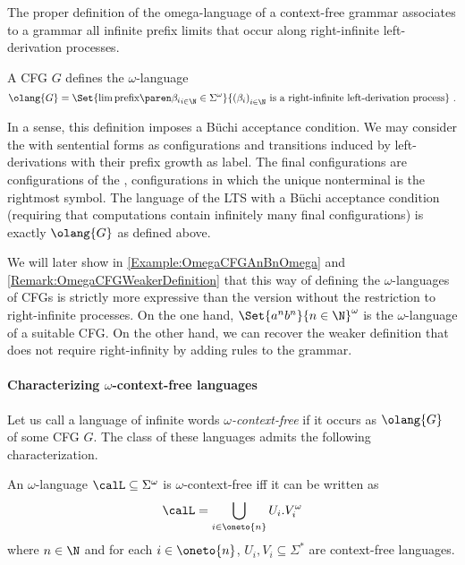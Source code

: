 \documentclass[../../diss.tex]{subfiles}
\begin{document}
The proper definition of the omega-language of a context-free grammar associates to a grammar all infinite prefix limits that occur along right-infinite left-derivation processes.

\begin{definition}
    A CFG $G$ defines the $\omega$-language
    \[
        \olang{G} =
        \Set{ \lim \tprefix{\beta_i}_{i \in \N} \in \Sigma^\omega }{ {(\beta_i)}_{i \in \N} \text{ is a right-infinite left-derivation process}}
        \ .
    \]
\end{definition}

In a sense, this definition imposes a Büchi acceptance condition.
We may consider the  with sentential forms as configurations and transitions induced by left-derivations with their prefix growth as label.
The final configurations are configurations of the , \ie configurations in which the unique nonterminal is the rightmost symbol.
The language of the LTS with a Büchi acceptance condition (\ie requiring that computations contain infinitely many final configurations) is exactly $\olang{G}$ as defined above.

We will later show in \cref{Example:OmegaCFGAnBnOmega} and \cref{Remark:OmegaCFGWeakerDefinition} that this way of defining the $\omega$-languages of CFGs is strictly more expressive than the version without the restriction to right-infinite processes.
On the one hand, $\Set{a^n b^n}{n \in \N}^\omega$ is the $\omega$-language of a suitable CFG.\@
On the other hand, we can recover the weaker definition that does not require right-infinity by adding rules to the grammar.

\paragraph{Characterizing $\omega$-context-free languages}

Let us call a language of infinite words \emph{$\omega$-context-free} if it occurs as $\olang{G}$ of some CFG $G$.
The class of these languages admits the following characterization.

\begin{theorem}%
\label{Theorem:CFGOmegaLangCharacterization}%
    An $\omega$-language $\calL \subseteq \Sigma^\omega$ is $\omega$-context-free iff it can be written as
    \[
        \calL = \bigcup_{i \in \oneto{n}} U_i . V_i^\omega
    \]
    where $n \in \N$ and for each $i \in \oneto{n}$, $U_i, V_i \subseteq \Sigma^*$ are context-free languages.
\end{theorem}
\end{document}
